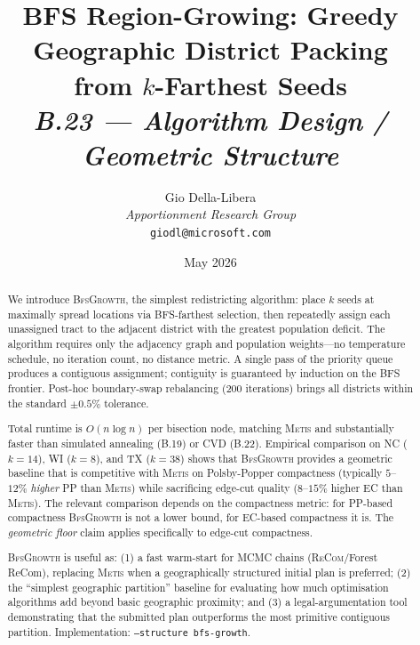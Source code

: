 \documentclass[12pt]{article}
\title{%
  \textbf{BFS Region-Growing: Greedy Geographic District Packing}\\
  \textbf{from $k$-Farthest Seeds}\\[0.8em]
  \normalsize\textit{B.23 --- Algorithm Design / Geometric Structure}%
}
\author{%
  Gio Della-Libera\\
  \textit{Apportionment Research Group}\\
  \small\texttt{giodl@microsoft.com}
}
\date{May 2026}
\newcommand{\bfsg}{\textsc{BfsGrowth}}
\newcommand{\metis}{\textsc{Metis}}
\newcommand{\recom}{\textsc{ReCom}}
\begin{document}
\maketitle

\begin{abstract}
\noindent
We introduce \bfsg{}, the simplest redistricting algorithm: place $k$ seeds
at maximally spread locations via BFS-farthest selection, then repeatedly
assign each unassigned tract to the adjacent district with the greatest
population deficit.
The algorithm requires only the adjacency graph and population weights---no
temperature schedule, no iteration count, no distance metric.
A single pass of the priority queue produces a contiguous assignment;
contiguity is guaranteed by induction on the BFS frontier.
Post-hoc boundary-swap rebalancing (200 iterations) brings all districts
within the standard $\pm 0.5\%$ tolerance.

Total runtime is $O(n \log n)$ per bisection node, matching \metis{} and
substantially faster than simulated annealing (B.19) or CVD (B.22).
Empirical comparison on NC ($k=14$), WI ($k=8$), and TX ($k=38$) shows
that \bfsg{} provides a geometric baseline that is competitive with \metis{}
on Polsby-Popper compactness (typically $5$--$12\%$ \emph{higher} PP than
\metis{}) while sacrificing edge-cut quality ($8$--$15\%$ higher EC than
\metis{}).
The relevant comparison depends on the compactness metric: for PP-based
compactness \bfsg{} is not a lower bound, for EC-based compactness it is.
The \emph{geometric floor} claim applies specifically to edge-cut compactness.

\bfsg{} is useful as: (1) a fast warm-start for MCMC chains
(\recom{}/Forest ReCom), replacing \metis{} when a geographically
structured initial plan is preferred; (2) the ``simplest geographic
partition'' baseline for evaluating how much optimisation algorithms
add beyond basic geographic proximity; and (3) a legal-argumentation
tool demonstrating that the submitted plan outperforms the most
primitive contiguous partition.
Implementation: \texttt{--structure bfs-growth}.
\end{abstract}










\end{document}
